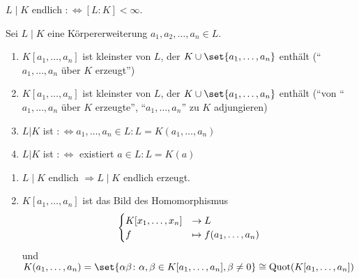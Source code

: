 \begin{definition}
	$L\mid K$ endlich $:\Leftrightarrow [L:K] < \infty$.
\end{definition}


\begin{definition}
	Sei $L\mid K$ eine Körpererweiterung $a_1, a_2, \dots, a_n \in L$.
	\begin{enumerate}
		\item $K[a_1, \dots, a_n]$ ist kleinster  von $L$, der $K \cup \set{a_1, \dots, a_n}$ enthält (``$a_1, \dots, a_n$ über $K$ erzeugt'')
		\item $K[a_1, \dots, a_n]$ ist kleinster  von $L$, der $K \cup \set{a_1, \dots, a_n}$ enthält (``von ``$a_1, \dots, a_n$ über $K$ erzeugte'', ``$a_1, \dots, a_n$'' zu $K$ adjungieren)
		\item $L | K$ ist  $:\Leftrightarrow a_1, \dots , a_n \in L : L=K(a_1, \dots, a_n)$
		\item $L | K$ ist  $:\Leftrightarrow$ existiert $a \in L: L=K(a)$  
	\end{enumerate}
\end{definition}

\begin{remark}
	\begin{enumerate}[label=(\alph*)]
		\item $L\mid K$ endlich $\Rightarrow L\mid K$ endlich erzeugt.
		\item $K[a_1, \dots, a_n]$ ist das Bild des Homomorphismus
		\begin{align}
		\begin{cases}
		K[x_1, \dots, x_n] &\to L\\
		f &\mapsto f(a_1, \dots, a_n)
		\end{cases}\notag
		\end{align}
		und $K(a_1, \dots , a_n) = \set{\alpha \beta \colon \alpha, \beta \in K[a_1, \dots, a_n], \beta \neq 0} \cong \Quot(K[a_1, \dots, a_n])$
	\end{enumerate}
\end{remark}